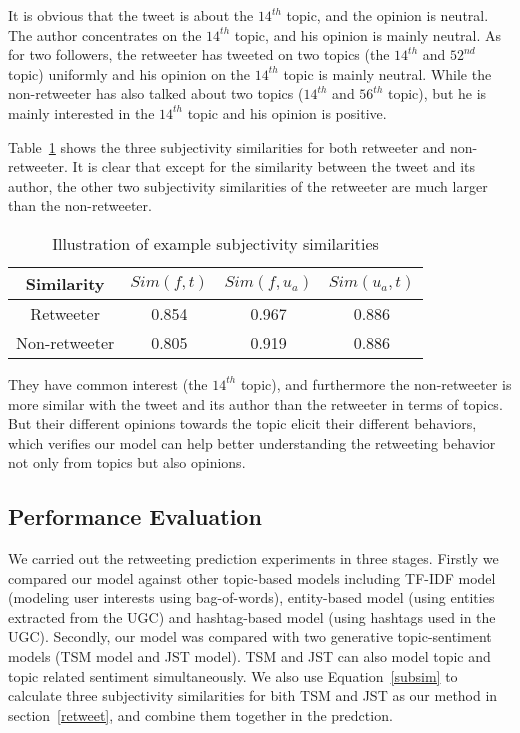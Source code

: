 It is obvious that the tweet is about the $ 14^{th} $ topic, and the opinion is neutral.
The author concentrates on the $ 14^{th} $ topic, and his opinion is mainly neutral.
As for two followers, the retweeter has tweeted on two topics (the $ 14^{th} $ and $ 52^{nd} $ topic) uniformly 
and his opinion on the $ 14^{th} $ topic is mainly neutral.
While the non-retweeter has also talked about two topics ($ 14^{th} $ and $ 56^{th} $ topic), but he is mainly interested in the $ 14^{th} $ topic 
and his opinion is positive.

Table~\ref{tab4} shows the three subjectivity similarities for both retweeter and non-retweeter. It is clear that except for the similarity between the tweet and its author, the other two subjectivity similarities of the retweeter are much larger than the non-retweeter.
\begin{table}[h]
\scriptsize
\centering
\caption{ Illustration of example subjectivity similarities}
\label{tab4}
\begin{tabular}{|c|c|c|c|}
\hline
Similarity & $ Sim(f,t) $ & $ Sim(f,u_a)  $ & $ Sim(u_a,t)  $\\
\hline
Retweeter & 0.854 & 0.967 & 0.886\\
\hline
Non-retweeter & 0.805 & 0.919 & 0.886\\
\hline
\end{tabular}
\end{table} 
They have common interest (the $ 14^{th} $ topic), and furthermore the non-retweeter is more similar with the tweet and its author than the retweeter in terms of topics. But their different opinions towards the topic elicit their different behaviors, which verifies our model can help better understanding the retweeting behavior not only from topics but also opinions.

\subsection{Performance Evaluation}

We carried out the retweeting prediction experiments in three stages. Firstly we compared our model against other topic-based models including TF-IDF model (modeling user interests using bag-of-words), entity-based model (using entities extracted from the UGC) and hashtag-based model (using hashtags used in the UGC).
Secondly, our model was compared with two generative topic-sentiment models (TSM model and JST model). TSM and JST can also model topic and topic related sentiment simultaneously. We also use Equation~\ref{subsim} to calculate three  subjectivity similarities for bith TSM and JST as our method in section~\ref{retweet}, and combine them together in the predction.

